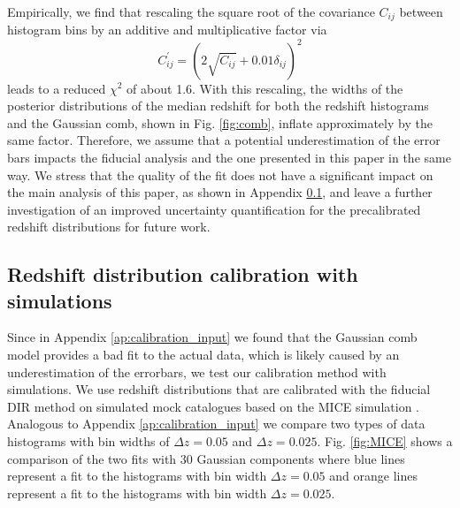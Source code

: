 \documentclass{aa}
\newcommand{\eq}[1]{\begin{equation}  #1 \end{equation}}
\begin{document}
\begin{appendix}
Empirically, we find that rescaling the square root of the covariance $C_{ij}$ between histogram bins by an additive and multiplicative factor via
\eq{
C^\prime_{ij} = \left(2\sqrt{C_{ij}}+0.01\delta_{ij}\right)^2
}
leads to a reduced $\chi^2$ of about 1.6. With this rescaling, the widths of the posterior distributions of the median redshift for both the redshift histograms and the Gaussian comb, shown in Fig. \ref{fig:comb}, inflate approximately by the same factor. Therefore, we assume that a potential underestimation of the error bars impacts the fiducial analysis and the one presented in this paper in the same way. We stress that the quality of the fit does not have a significant impact on the main analysis of this paper, as shown in Appendix \ref{sec:MICE}, and leave a further investigation of an improved uncertainty quantification for the precalibrated redshift distributions for future work.
\subsection{Redshift distribution calibration with simulations}
\label{sec:MICE}
Since in Appendix \ref{ap:calibration_input} we found that the Gaussian comb model provides a bad fit to the actual data, which is likely caused by an underestimation of the errorbars, we test our calibration method with simulations. We use redshift distributions that are calibrated with the fiducial DIR method on simulated mock catalogues \citep{vdBusch20} based on the MICE simulation \citep{Mice1, Mice2, Mice3, carretero, hoffmann}. Analogous to Appendix \ref{ap:calibration_input} we compare two types of data histograms with bin widths of $\Delta z = 0.05$ and $\Delta z = 0.025$. Fig. \ref{fig:MICE} shows a comparison of the two fits with 30 Gaussian components where blue lines represent a fit to the histograms with bin width $\Delta z = 0.05$ and orange lines represent a fit to the histograms with bin width $\Delta z = 0.025$. 


\end{appendix}
\end{document}
